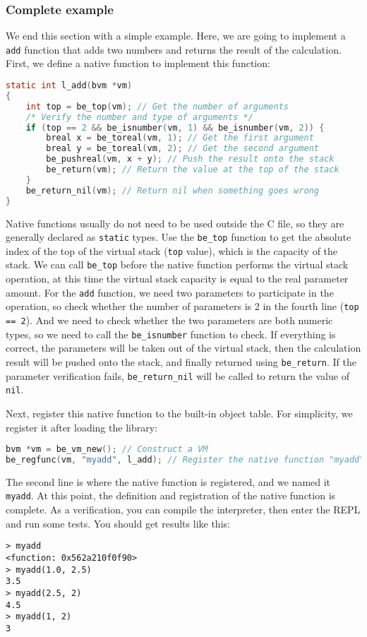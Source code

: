 \subsubsection {Complete example}We end this section with a simple example. Here, we are going to implement a \texttt{add} function that adds two numbers and returns the result of the calculation. First, we define a native function to implement this function:
\begin{lstlisting}[language=c, style=berry]
static int l_add(bvm *vm)
{
    int top = be_top(vm); // Get the number of arguments
    /* Verify the number and type of arguments */
    if (top == 2 && be_isnumber(vm, 1) && be_isnumber(vm, 2)) {
        breal x = be_toreal(vm, 1); // Get the first argument
        breal y = be_toreal(vm, 2); // Get the second argument
        be_pushreal(vm, x + y); // Push the result onto the stack
        be_return(vm); // Return the value at the top of the stack
    }
    be_return_nil(vm); // Return nil when something goes wrong
}
\end{lstlisting}
Native functions usually do not need to be used outside the C file, so they are generally declared as \texttt{static} types. Use the \texttt{be\_top} function to get the absolute index of the top of the virtual stack (\texttt{top} value), which is the capacity of the stack. We can call \texttt{be\_top} before the native function performs the virtual stack operation, at this time the virtual stack capacity is equal to the real parameter amount. For the \texttt{add} function, we need two parameters to participate in the operation, so check whether the number of parameters is 2 in the fourth line (\texttt{top == 2}). And we need to check whether the two parameters are both numeric types, so we need to call the \texttt{be\_isnumber} function to check. If everything is correct, the parameters will be taken out of the virtual stack, then the calculation result will be pushed onto the stack, and finally returned using \texttt{be\_return}. If the parameter verification fails, \texttt{be\_return\_nil} will be called to return the value of \texttt{nil}.

Next, register this native function to the built-in object table. For simplicity, we register it after loading the library:
\begin{lstlisting}[language=c, style=berry]
bvm *vm = be_vm_new(); // Construct a VM
be_regfunc(vm, "myadd", l_add); // Register the native function "myadd"
\end{lstlisting}
The second line is where the native function is registered, and we named it \texttt{myadd}. At this point, the definition and registration of the native function is complete. As a verification, you can compile the interpreter, then enter the REPL and run some tests. You should get results like this:
\begin{lstlisting}[language=berry, numbers=none]
> myadd
<function: 0x562a210f0f90>
> myadd(1.0, 2.5)
3.5
> myadd(2.5, 2)
4.5
> myadd(1, 2)
3
\end{lstlisting}

